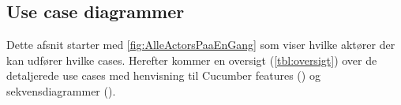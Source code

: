 \subsection{Use case diagrammer}
Dette afsnit starter med \cref{fig:AlleActorsPaaEnGang} som viser hvilke aktører der kan udfører hvilke cases. Herefter kommer en oversigt (\cref{tbl:oversigt}) over de detaljerede use cases med henvisning til Cucumber features () og sekvensdiagrammer ().

